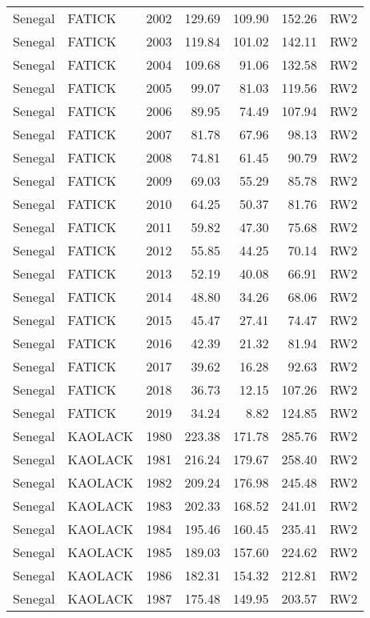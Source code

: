 \begin{longtable}{lllrrrl}
  Senegal & FATICK & 2002 & 129.69 & 109.90 & 152.26 & RW2 \\ 
  Senegal & FATICK & 2003 & 119.84 & 101.02 & 142.11 & RW2 \\ 
  Senegal & FATICK & 2004 & 109.68 & 91.06 & 132.58 & RW2 \\ 
  Senegal & FATICK & 2005 & 99.07 & 81.03 & 119.56 & RW2 \\ 
  Senegal & FATICK & 2006 & 89.95 & 74.49 & 107.94 & RW2 \\ 
  Senegal & FATICK & 2007 & 81.78 & 67.96 & 98.13 & RW2 \\ 
  Senegal & FATICK & 2008 & 74.81 & 61.45 & 90.79 & RW2 \\ 
  Senegal & FATICK & 2009 & 69.03 & 55.29 & 85.78 & RW2 \\ 
  Senegal & FATICK & 2010 & 64.25 & 50.37 & 81.76 & RW2 \\ 
  Senegal & FATICK & 2011 & 59.82 & 47.30 & 75.68 & RW2 \\ 
  Senegal & FATICK & 2012 & 55.85 & 44.25 & 70.14 & RW2 \\ 
  Senegal & FATICK & 2013 & 52.19 & 40.08 & 66.91 & RW2 \\ 
  Senegal & FATICK & 2014 & 48.80 & 34.26 & 68.06 & RW2 \\ 
  Senegal & FATICK & 2015 & 45.47 & 27.41 & 74.47 & RW2 \\ 
  Senegal & FATICK & 2016 & 42.39 & 21.32 & 81.94 & RW2 \\ 
  Senegal & FATICK & 2017 & 39.62 & 16.28 & 92.63 & RW2 \\ 
  Senegal & FATICK & 2018 & 36.73 & 12.15 & 107.26 & RW2 \\ 
  Senegal & FATICK & 2019 & 34.24 & 8.82 & 124.85 & RW2 \\ 
  Senegal & KAOLACK & 1980 & 223.38 & 171.78 & 285.76 & RW2 \\ 
  Senegal & KAOLACK & 1981 & 216.24 & 179.67 & 258.40 & RW2 \\ 
  Senegal & KAOLACK & 1982 & 209.24 & 176.98 & 245.48 & RW2 \\ 
  Senegal & KAOLACK & 1983 & 202.33 & 168.52 & 241.01 & RW2 \\ 
  Senegal & KAOLACK & 1984 & 195.46 & 160.45 & 235.41 & RW2 \\ 
  Senegal & KAOLACK & 1985 & 189.03 & 157.60 & 224.62 & RW2 \\ 
  Senegal & KAOLACK & 1986 & 182.31 & 154.32 & 212.81 & RW2 \\ 
  Senegal & KAOLACK & 1987 & 175.48 & 149.95 & 203.57 & RW2 \\ 

\end{longtable}

